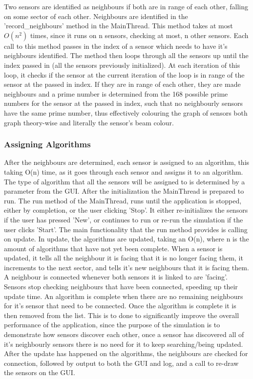 Two sensors are identified as neighbours if both are in range of each other, falling on some 
sector of each other. Neighbours are identified in the 'record\_neighbours' method in the 
MainThread. This method takes at most $O(n^2)$ times, since it runs on n sensors, checking at 
most, n other sensors. Each call to this method passes in the index of a sensor which needs to 
have it's neighbours identified. The method then loops through all the sensors up until the 
index passed in (all the sensors previously initialized). At each iteration of this loop, it 
checks if the sensor at the current iteration of the loop is in range of the sensor at the 
passed in index. If they are in range of each other, they are made neighbours and a prime 
number is determined from the 168 possible prime numbers for the sensor at the passed in 
index, such that no neighbourly sensors have the same prime number, thus effectively colouring 
the graph of sensors both graph theory-wise and literally the sensor's beam colour. 

\subsubsection{Assigning Algorithms}

After the neighbours are determined, each sensor is assigned to an algorithm, this taking O(n) 
time, as it goes through each sensor and assigns it to an algorithm. The type of algorithm 
that all the sensors will be assigned to is determined by a parameter from the GUI. After the 
initialization the MainThread is prepared to run.  The run method of the MainThread, runs 
until the application is stopped, either by completion, or the user clicking 'Stop'. It either 
re-initializes the sensors if the user has pressed 'New', or continues to run or re-run the 
simulation if the user clicks 'Start'. The main functionality that the run method provides is 
calling on update. In update, the algorithms are updated, taking an O(n), where n is the 
amount of algorithms that have not yet been complete. When a sensor is updated, it tells all 
the neighbour it is facing that it is no longer facing them, it increments to the next sector, 
and tells it's new neighbours that it is facing them. A neighbour is connected whenever both 
sensors it is linked to are 'facing'. Sensors stop checking neighbours that have been 
connected, speeding up their update time. An algorithm is complete when there are no remaining 
neighbours for it's sensor that need to be connected. Once the algorithm is complete it is 
then removed from the list. This is to done to significantly improve the overall performance 
of the application, since the purpose of the simulation is to demonstrate how sensors discover 
each other, once a sensor has discovered all of it's neighbourly sensors there is no need for 
it to keep searching/being updated. After the update has happened on the algorithms, the 
neighbours are checked for connection, followed by output to both the GUI and log, and a call 
to re-draw the sensors on the GUI. 

